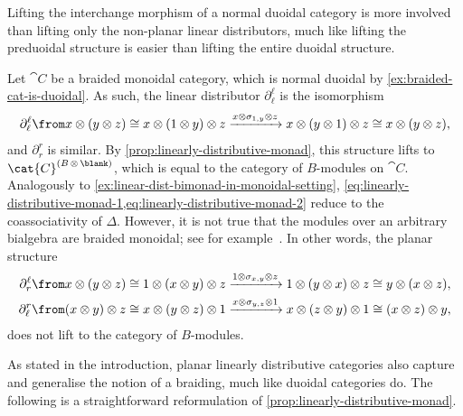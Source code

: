 Lifting the interchange morphism of a normal duoidal category is more involved than lifting only the non-planar linear distributors,
much like lifting the preduoidal structure is easier than lifting the entire duoidal structure.

\begin{example}
  Let \(\cat{C}\) be a braided monoidal category,
  which is normal duoidal by \cref{ex:braided-cat-is-duoidal}.
  As such, the linear distributor \(\partial_\ell^{\ell}\) is the isomorphism
  \[
    \partial_{\ell}^{\ell} \from x \otimes (y \otimes z)
    \cong x \otimes (1 \otimes y) \otimes z
    \xrightarrow{x \otimes \sigma_{1, y} \otimes z} x \otimes (y \otimes 1) \otimes z
    \cong x \otimes (y \otimes z),
  \]
  and \(\partial^r_r\) is similar.
  By \cref{prop:linearly-distributive-monad},
  this structure lifts to \(\cat{C}^{(B\,\otimes\,\blank)}\),
  which is equal to the category of \(B\)\hyp{}modules on \(\cat{C}\).
  Analogously to \cref{ex:linear-dist-bimonad-in-monoidal-setting},
  \cref{eq:linearly-distributive-monad-1,eq:linearly-distributive-monad-2}
  reduce to the coassociativity of \(\Delta\).
  However, it is not true that the modules over an arbitrary bialgebra are braided monoidal;
  see for example~\cite[Example~8.3.5]{Etingof2015}.
  In other words, the planar structure
  \begin{align*}
    \partial_r^{\ell} &\from x \otimes (y \otimes z)
             \cong 1 \otimes (x \otimes y) \otimes z
             \xrightarrow{1 \otimes \sigma_{x, y} \otimes z} 1 \otimes (y \otimes x) \otimes z
             \cong y \otimes (x \otimes z), \\
    \partial_\ell^r &\from (x \otimes y) \otimes z
           \cong x \otimes (y \otimes z) \otimes 1
           \xrightarrow{x \otimes \sigma_{y, z} \otimes 1} x \otimes (z \otimes y) \otimes 1
           \cong (x \otimes z) \otimes y,
  \end{align*}
  does not lift to the category of \(B\)\hyp{}modules.
\end{example}

As stated in the introduction,
planar linearly distributive categories also capture and generalise the notion of a braiding,
much like duoidal categories do.
The following is a straightforward reformulation of \cref{prop:linearly-distributive-monad}.

